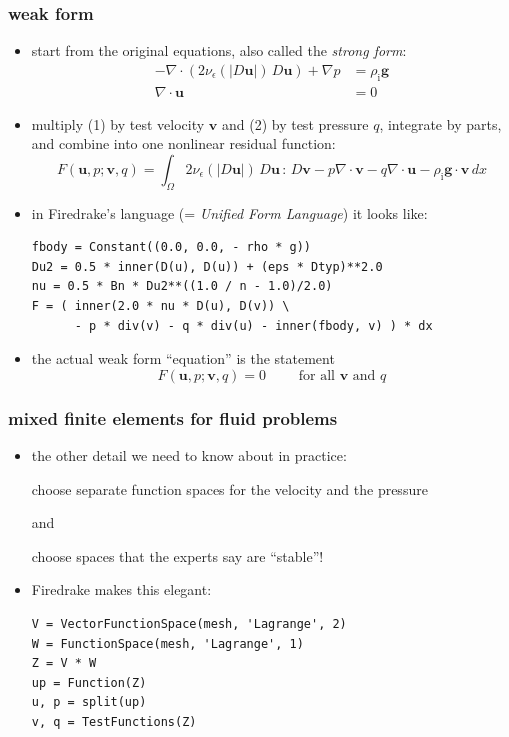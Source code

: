\documentclass[10pt,hyperref,dvipsnames]{beamer}
\newcommand{\bv}{\mathbf{v}}
\newcommand{\bu}{\mathbf{u}}
\newcommand{\Div}{\nabla\cdot}
\newcommand{\eps}{\epsilon}
\newcommand{\rhoi}{\rho_{\text{i}}}
\begin{document}
\begin{frame}[fragile]
\frametitle{weak form}

\begin{itemize}
\item start from the original equations, also called the \emph{strong form}:
\small
\begin{align}
- \nabla \cdot \left(2 \nu_\eps(|D\bu|)\, D\bu\right) + \nabla p &= \rhoi \mathbf{g} \\
\Div \bu &= 0
\end{align}
\normalsize
\item multiply (1) by test velocity $\bv$ and (2) by test pressure $q$, integrate by parts, and combine into one nonlinear residual function:
    $$F(\bu,p;\bv,q) = \int_{\Omega} 2 \nu_\eps(|D\bu|)\, D\bu\,:\,D\bv - p \nabla \cdot \bv - q \nabla \cdot \bu - \rhoi \mathbf{g} \cdot \bv \,dx$$
\item in Firedrake's language (= \emph{Unified Form Language}) it looks like:

\medskip
\begin{Verbatim}[fontsize=\small]
fbody = Constant((0.0, 0.0, - rho * g))
Du2 = 0.5 * inner(D(u), D(u)) + (eps * Dtyp)**2.0
nu = 0.5 * Bn * Du2**((1.0 / n - 1.0)/2.0)
F = ( inner(2.0 * nu * D(u), D(v)) \
      - p * div(v) - q * div(u) - inner(fbody, v) ) * dx
\end{Verbatim}

\medskip
\item the actual weak form ``equation'' is the statement
   $$F(\bu,p;\bv,q) = 0 \qquad \text{ for all } \bv \text{ and } q$$
\end{itemize}
\end{frame}


\begin{frame}[fragile]
\frametitle{mixed finite elements for fluid problems}

\begin{itemize}
\item the other detail we need to know about in practice:

\bigskip
\begin{center}
\alert{choose separate function spaces for the velocity and the pressure}
\end{center}

\bigskip
\begin{center}
and
\end{center}

\bigskip
\begin{center}
\alert{choose spaces that the experts say are ``stable''!}
\end{center}

\bigskip
\item Firedrake makes this elegant:

\medskip
\begin{Verbatim}[fontsize=\small]
V = VectorFunctionSpace(mesh, 'Lagrange', 2)
W = FunctionSpace(mesh, 'Lagrange', 1)
Z = V * W
up = Function(Z)
u, p = split(up)
v, q = TestFunctions(Z)
\end{Verbatim}
\end{itemize}
\end{frame}
\end{document}
